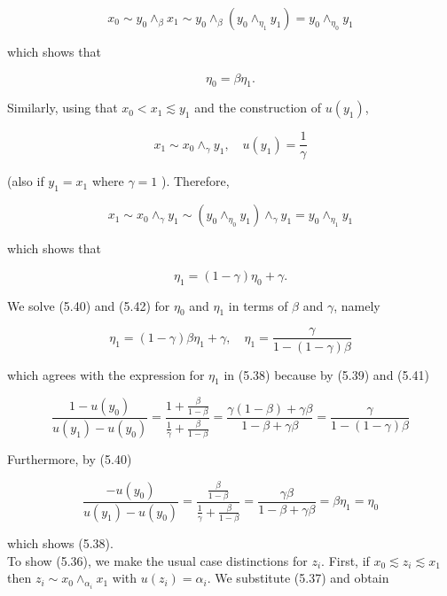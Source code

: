 \documentclass[12pt]{article}
\begin{document}
$$
x_{0} \sim y_{0} \wedge_{\beta} x_{1} \sim y_{0} \wedge_{\beta}\left(y_{0} \wedge_{\eta_{1}} y_{1}\right)=y_{0} \wedge_{\eta_{0}} y_{1}
$$

which shows that


\begin{equation*}
\eta_{0}=\beta \eta_{1} . \tag{5.40}
\end{equation*}


Similarly, using that $x_{0}<x_{1} \lesssim y_{1}$ and the construction of $u\left(y_{1}\right)$,


\begin{equation*}
x_{1} \sim x_{0} \wedge_{\gamma} y_{1}, \quad u\left(y_{1}\right)=\frac{1}{\gamma} \tag{5.41}
\end{equation*}


(also if $y_{1}=x_{1}$ where $\gamma=1$ ). Therefore,

$$
x_{1} \sim x_{0} \wedge_{\gamma} y_{1} \sim\left(y_{0} \wedge_{\eta_{0}} y_{1}\right) \wedge_{\gamma} y_{1}=y_{0} \wedge_{\eta_{1}} y_{1}
$$

which shows that


\begin{equation*}
\eta_{1}=(1-\gamma) \eta_{0}+\gamma . \tag{5.42}
\end{equation*}


We solve (5.40) and (5.42) for $\eta_{0}$ and $\eta_{1}$ in terms of $\beta$ and $\gamma$, namely

$$
\eta_{1}=(1-\gamma) \beta \eta_{1}+\gamma, \quad \eta_{1}=\frac{\gamma}{1-(1-\gamma) \beta}
$$

which agrees with the expression for $\eta_{1}$ in (5.38) because by (5.39) and (5.41)

$$
\frac{1-u\left(y_{0}\right)}{u\left(y_{1}\right)-u\left(y_{0}\right)}=\frac{1+\frac{\beta}{1-\beta}}{\frac{1}{\gamma}+\frac{\beta}{1-\beta}}=\frac{\gamma(1-\beta)+\gamma \beta}{1-\beta+\gamma \beta}=\frac{\gamma}{1-(1-\gamma) \beta}
$$

Furthermore, by (5.40)

$$
\frac{-u\left(y_{0}\right)}{u\left(y_{1}\right)-u\left(y_{0}\right)}=\frac{\frac{\beta}{1-\beta}}{\frac{1}{\gamma}+\frac{\beta}{1-\beta}}=\frac{\gamma \beta}{1-\beta+\gamma \beta}=\beta \eta_{1}=\eta_{0}
$$

which shows (5.38).\\
To show (5.36), we make the usual case distinctions for $z_{i}$. First, if $x_{0} \lesssim z_{i} \lesssim x_{1}$ then $z_{i} \sim x_{0} \wedge_{\alpha_{i}} x_{1}$ with $u\left(z_{i}\right)=\alpha_{i}$. We substitute (5.37) and obtain
\end{document}
